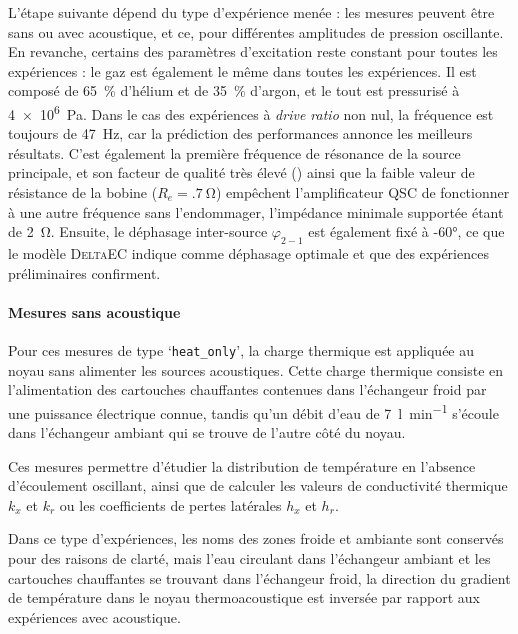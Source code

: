 L'étape suivante dépend du type d'expérience menée : les mesures peuvent être sans ou avec acoustique, et ce, pour  différentes amplitudes de pression oscillante. En revanche, certains des paramètres d'excitation reste constant pour toutes les expériences :  le gaz est également le même dans toutes les expériences. Il est composé de \qty{65}{\percent} d'hélium et de \qty{35}{\percent} d'argon, et le tout est pressurisé à \qty{4e6}{\pascal}. Dans le cas des expériences à \textit{drive ratio} non nul, la fréquence est toujours de \qty{47}{\hertz}, car la prédiction des performances annonce les meilleurs résultats. C'est également la première fréquence de résonance de la source principale, et son facteur de qualité très élevé () ainsi que la faible valeur de résistance de la bobine ($R_e=\qty{.7}{\ohm}$) empêchent l'amplificateur QSC de fonctionner à une autre fréquence sans l'endommager, l'impédance minimale supportée étant de \qty{2}{\ohm}. Ensuite, le déphasage inter-source $\varphi_{2-1}$ est également fixé à \ang{-60}, ce que le modèle \textsc{DeltaEC} indique comme déphasage optimale et que des expériences préliminaires confirment.

\paragraph{Mesures sans acoustique}\label{chap:MesureSansAcou}
Pour ces mesures de type `\texttt{heat\_{}only}', la charge thermique est appliquée au noyau sans alimenter les sources acoustiques. Cette charge thermique consiste en l'alimentation des cartouches chauffantes contenues dans l'échangeur froid par une puissance électrique connue, tandis qu'un débit d'eau de \qty{7}{\litre\per\minute} s'écoule dans l'échangeur ambiant qui se trouve de l'autre côté du noyau. 

Ces mesures  permettre d'étudier la distribution de température en l'absence d'écoulement oscillant, ainsi que de calculer les valeurs de conductivité thermique $k_x$ et $k_r$ ou les coefficients de pertes latérales $h_x$ et $h_r$.\medskip

Dans ce type d'expériences, les noms des zones \og froide \fg{} et \og ambiante \fg{} sont conservés pour des raisons de clarté, mais l'eau circulant dans l'échangeur ambiant et les cartouches chauffantes se trouvant dans l'échangeur froid, la direction du gradient de température dans le noyau thermoacoustique est inversée par rapport aux expériences avec acoustique. %

